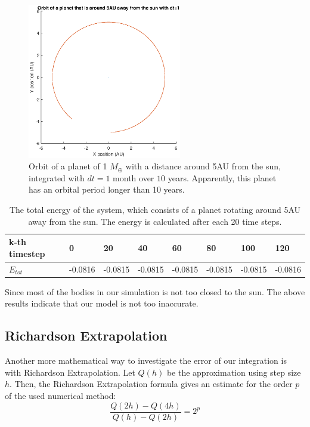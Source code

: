 \begin{figure}[H]
\centering
\includegraphics[width=0.6\textwidth]{Planeet_5AU_dt1_10jaar.eps}
\caption{Orbit of a planet of 1 $M_{\oplus}$ with a distance around 5AU from the sun, integrated with $dt=1$ month over $10$ years. Apparently, this planet has an orbital period longer than 10 years.}
    \label{fig:Planet5AUdt1}
\end{figure}

\begin{table}[htb]
\centering
\caption{The total energy of the system, which consists of a planet rotating around 5AU away from the sun. The energy is calculated after each 20 time steps.}
\begin{tabular}{|l|l|l|l|l|l|l|l|}
\hline
k-th timestep&0&20&40&60&80&100&120\\ \hline
$E_{tot}$&-0.0816&   -0.0815&   -0.0815&   -0.0815&   -0.0815&   -0.0815&   -0.0816\\ \hline
\end{tabular}
\label{tab:Planet5AUEnergy}
\end{table}

Since most of the bodies in our simulation is not too closed to the sun. 
The above results indicate that our model is not too inaccurate.

\subsection{Richardson Extrapolation}
Another more mathematical way to investigate the error of our integration is with Richardson Extrapolation. 
Let $Q(h)$ be the approximation using step size $h$. 
Then, the Richardson Extrapolation formula \cite{Richardson} gives an estimate for the order $p$ of the used numerical method:
\[\frac{Q(2h)-Q(4h)}{Q(h)-Q(2h)}=2^p\]

